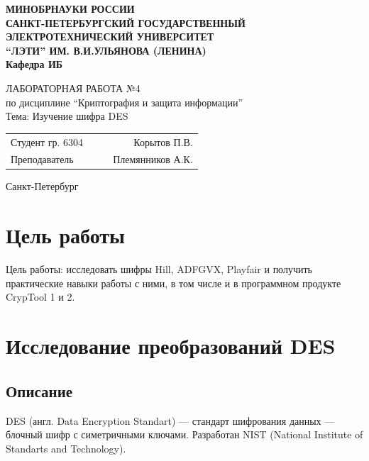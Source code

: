 \documentclass[a4paper, 14pt]{extarticle}
\begin{document}
\begin{titlepage}
    \centering
    {\bfseries
        \uppercase{
            Минобрнауки России \\
            Санкт-Петербургский государственный \\
            Электротехнический университет \\
            \enquote{ЛЭТИ} им. В.И.Ульянова (Ленина)\\
        }
        Кафедра ИБ

        \vspace{\fill}
        \uppercase{Лабораторная работа №4} \\
        по дисциплине \enquote{Криптография и защита информации} \\
        Тема: Изучение шифра DES
    }

    \vspace{\fill}
    \begin{tabularx}{0.8\textwidth}{l X c r}
        Студент гр. 6304 & & \underline{\hspace{3cm}} & Корытов П.В.\\
        Преподаватель & & \underline{\hspace{3cm}} & Племянников А.К.
    \end{tabularx}

    \vspace{1cm}
    Санкт-Петербург \\
    \the\year{}
\end{titlepage}

\newpage

\section*{Цель работы}
Цель работы: исследовать шифры Hill, ADFGVX, Playfair и получить практические навыки работы с ними, в том числе и в программном продукте CrypTool 1 и 2.

\section{Исследование преобразований DES}
\subsection{Описание}%
\label{sub:des_descr}
DES (англ. Data Encryption Standart) --- стандарт шифрования данных --- блочный шифр с симетричными ключами. Разработан NIST (National Institute of Standarts and Technology).
\end{document}
